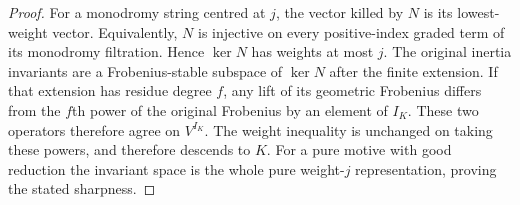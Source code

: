 \begin{proof}
For a monodromy string centred at $j$, the vector killed by $N$ is
its lowest-weight vector.  Equivalently, $N$ is injective on every
positive-index graded term of its monodromy filtration.  Hence
$\ker N$ has weights at most $j$.  The original inertia invariants
are a Frobenius-stable subspace of $\ker N$ after the finite
extension.  If that extension has residue degree $f$, any lift of
its geometric Frobenius differs from the $f$th power of the original
Frobenius by an element of $I_K$.  These two operators therefore
agree on $V^{I_K}$.  The weight inequality is unchanged
on taking these powers, and therefore descends to $K$.
For a pure motive with good reduction the invariant space is the
whole pure weight-$j$ representation, proving the stated sharpness.
\end{proof}

